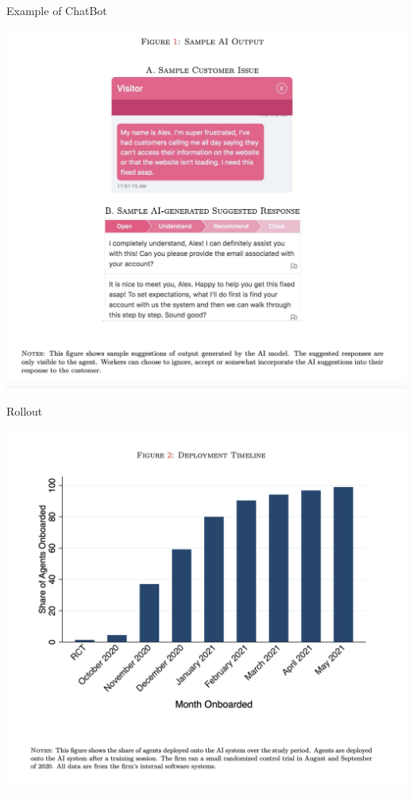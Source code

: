 \documentclass{beamer}
\begin{document}
\begin{frame}{Example of ChatBot}
\begin{center}
\includegraphics[scale=0.35]{./lecture_includes/brynn1}
\end{center}
\end{frame}


\begin{frame}{Rollout}
\begin{center}
\includegraphics[scale=0.35]{./lecture_includes/brynn2}
\end{center}
\end{frame}
\end{document}
